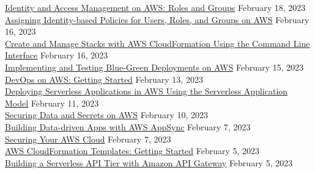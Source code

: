 \documentclass[10pt]{res} %
\begin{document}
\begin{resume}
\href{https://bjdelacruz.dev/files/certificates/pluralsight/Identity_and_Access_Management_on_AWS_Roles_and_Groups.pdf}{\color{blue}Identity and Access Management on AWS: Roles and Groups} \hfill February 18, 2023 \\
\href{https://bjdelacruz.dev/files/certificates/pluralsight/Assigning_Identity_based_Policies_for_Users_Roles_and_Groups_on_AWS.pdf}{\color{blue}Assigning Identity-based Policies for Users, Roles, and Groups on AWS} \hfill February 16, 2023 \\
\href{https://bjdelacruz.dev/files/certificates/pluralsight/Create_and_Manage_Stacks_with_AWS_CloudFormation_Using_the_Command_Line_Interface.pdf}{\color{blue}Create and Manage Stacks with AWS CloudFormation Using the Command Line Interface} \hfill February 16, 2023 \\
\href{https://bjdelacruz.dev/files/certificates/pluralsight/Implementing_and_Testing_Blue_Green_Deployments_on_AWS.pdf}{\color{blue}Implementing and Testing Blue-Green Deployments on AWS} \hfill February 15, 2023 \\
\href{https://bjdelacruz.dev/files/certificates/pluralsight/DevOps_on_AWS_Getting_Started.pdf}{\color{blue}DevOps on AWS: Getting Started} \hfill February 13, 2023 \\
\href{https://bjdelacruz.dev/files/certificates/pluralsight/Deploying_Serverless_Applications_in_AWS_Using_the_Serverless_Application_Model.pdf}{\color{blue}Deploying Serverless Applications in AWS Using the Serverless Application Model} \hfill February 11, 2023 \\
\href{https://bjdelacruz.dev/files/certificates/pluralsight/Securing_Data_and_Secrets_on_AWS.pdf}{\color{blue}Securing Data and Secrets on AWS} \hfill February 10, 2023 \\
\href{https://bjdelacruz.dev/files/certificates/pluralsight/Building_Data_driven_Apps_with_AWS_AppSync.pdf}{\color{blue}Building Data-driven Apps with AWS AppSync} \hfill February 7, 2023 \\
\href{https://bjdelacruz.dev/files/certificates/pluralsight/Securing_Your_AWS_Cloud.pdf}{\color{blue}Securing Your AWS Cloud} \hfill February 7, 2023 \\
\href{https://bjdelacruz.dev/files/certificates/pluralsight/AWS_CloudFormation_Templates_Getting_Started.pdf}{\color{blue}AWS CloudFormation Templates: Getting Started} \hfill February 5, 2023 \\
\href{https://bjdelacruz.dev/files/certificates/pluralsight/Building_a_Serverless_API_Tier_with_Amazon_API_Gateway.pdf}{\color{blue}Building a Serverless API Tier with Amazon API Gateway} \hfill February 5, 2023 \\

\end{resume}
\end{document}
